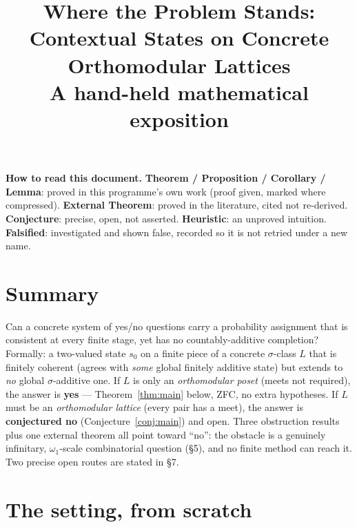 \documentclass[11pt]{article}
\title{Where the Problem Stands: Contextual States on Concrete Orthomodular
Lattices\\[4pt]\large A hand-held mathematical exposition}
\author{}
\date{}
\theoremstyle{remark}
\begin{document}
\maketitle

\begin{center}
\begin{minipage}{0.92\textwidth}
\small
\noindent\textbf{How to read this document.} \textbf{Theorem / Proposition /
Corollary / Lemma}: proved in this programme's own work (proof given, marked
where compressed). \textbf{External Theorem}: proved in the literature, cited
not re-derived. \textbf{Conjecture}: precise, open, not asserted.
\textbf{Heuristic}: an unproved intuition. \textbf{Falsified}: investigated
and shown false, recorded so it is not retried under a new name.
\end{minipage}
\end{center}

\bigskip

\section*{Summary}

Can a concrete system of yes/no questions carry a probability assignment that
is consistent at every finite stage, yet has no countably-additive completion?
Formally: a two-valued state $s_0$ on a finite piece of a concrete
$\sigma$-class $L$ that is finitely coherent (agrees with \emph{some} global
finitely additive state) but extends to \emph{no} global $\sigma$-additive
one. If $L$ is only an \emph{orthomodular poset} (meets not required), the
answer is \textbf{yes} — Theorem~\ref{thm:main} below, ZFC, no extra
hypotheses. If $L$ must be an \emph{orthomodular lattice} (every pair has a
meet), the answer is \textbf{conjectured no} (Conjecture~\ref{conj:main}) and
open. Three obstruction results plus one external theorem all point toward
``no'': the obstacle is a genuinely infinitary, $\omega_1$-scale combinatorial
question (\S5), and no finite method can reach it. Two precise open routes are
stated in \S7.

\tableofcontents

\section{The setting, from scratch}
\end{document}
